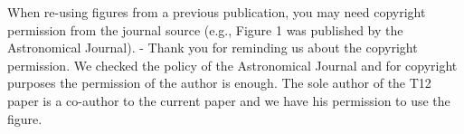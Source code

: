 When re-using figures from a previous publication, you may need copyright permission from the journal source (e.g., Figure 1 was published by the Astronomical Journal).
    - Thank you for reminding us about the copyright permission. We checked the policy of the Astronomical Journal and for copyright purposes the permission of the author is enough. The sole author of the T12 paper is a co-author to the current paper and we have his permission to use the figure.
